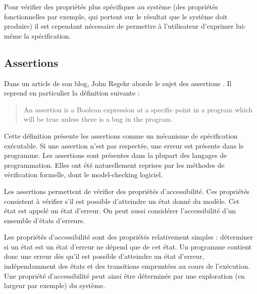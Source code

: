 Pour vérifier des propriétés plus spécifiques au système (des propriétés
fonctionnelles par exemple, qui portent sur le résultat que le système doit
produire) il est cependant nécessaire de permettre à l'utilisateur d'exprimer
lui-même la spécification.

\subsection{Assertions}

Dans un article de son blog, John Regehr aborde le sujet des assertions
\cite{assertion_regehr}. Il reprend en particulier la définition suivante :

\begin{quotation}
An assertion is a Boolean expression at a specific point in a program which will
be true unless there is a bug in the program.
\hfill \cite{assertion_regehr}
\end{quotation}





Cette définition présente les assertions comme un mécanisme de spécification
exécutable. Si une assertion n'est pas respectée, une erreur est présente dans
le programme. Les assertions sont présentes dans la plupart des langages de
programmation. Elles ont été naturellement reprises par les méthodes de
vérification formelle, dont le model-checking logiciel.

Les assertions permettent de vérifier des propriétés d'accessibilité. Ces
propriétés consistent à vérifier s’il est possible d'atteindre un état donné du
modèle. Cet état est appelé un état d'erreur. On peut aussi considérer
l'accessibilité d'un ensemble d'états d'erreurs.

Les propriétés d'accessibilité sont des propriétés relativement simples :
déterminer si un état est un état d'erreur ne dépend que de cet état. Un
programme contient donc une erreur dès qu'il est possible d'atteindre un état
d'erreur, indépendamment des états et des transitions empruntées au cours de
l'exécution. Une propriété d'accessibilité peut ainsi être déterminée par une
exploration (en largeur par exemple) du système.

